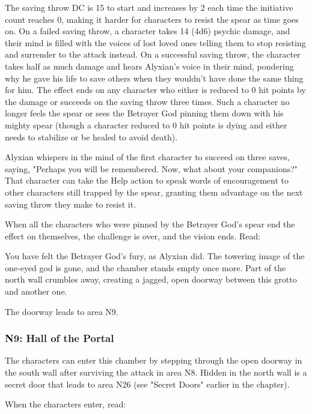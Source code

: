 \documentclass[letterpaper, 11pt, bg=full, twocolumn]{dndbook}
\begin{document}
The saving throw DC is 15 to start and increases by 2 each time the initiative count reaches 0, making it harder for characters to resist the spear as time goes on. On a failed saving throw, a character takes 14 (4d6) psychic damage, and their mind is filled with the voices of lost loved ones telling them to stop resisting and surrender to the attack instead. On a successful saving throw, the character takes half as much damage and hears Alyxian's voice in their mind, pondering why he gave his life to save others when they wouldn't have done the same thing for him. The effect ends on any character who either is reduced to 0 hit points by the damage or succeeds on the saving throw three times. Such a character no longer feels the spear or sees the Betrayer God pinning them down with his mighty spear (though a character reduced to 0 hit points is dying and either needs to stabilize or be healed to avoid death).

Alyxian whispers in the mind of the first character to succeed on three saves, saying, "Perhaps you will be remembered. Now, what about your companions?" That character can take the Help action to speak words of encouragement to other characters still trapped by the spear, granting them advantage on the next saving throw they make to resist it.

When all the characters who were pinned by the Betrayer God's spear end the effect on themselves, the challenge is over, and the vision ends. Read:

\begin{DndReadAloud}
You have felt the Betrayer God's fury, as Alyxian did. The towering image of the one-eyed god is gone, and the chamber stands empty once more. Part of the north wall crumbles away, creating a jagged, open doorway between this grotto and another one.
\end{DndReadAloud}

The doorway leads to area N9.

\subsubsection{N9: Hall of the Portal}

The characters can enter this chamber by stepping through the open doorway in the south wall after surviving the attack in area N8. Hidden in the north wall is a secret door that leads to area N26 (see "Secret Doors" earlier in the chapter).

When the characters enter, read:
\end{document}
